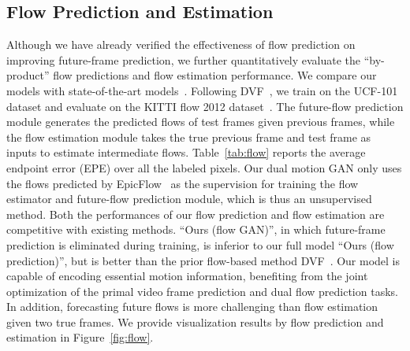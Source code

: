 \documentclass[10pt,twocolumn,letterpaper]{article}
\begin{document}
	\subsection{Flow Prediction and Estimation}
	Although we have already verified the effectiveness of flow prediction on improving future-frame prediction,
	we further quantitatively evaluate the ``by-product'' flow predictions and flow estimation performance. We compare our models with state-of-the-art models~\cite{brox2011large,revaud2015epicflow,fischer2015flownet}. Following DVF~\cite{liu2017video}, we train on the UCF-101 dataset and evaluate on the KITTI flow 2012 dataset~\cite{geiger2013vision}. The future-flow prediction module generates the predicted flows of test frames given previous frames, while the flow estimation module takes the true previous frame and test frame as inputs to estimate intermediate flows. Table~\ref{tab:flow} reports the average endpoint error (EPE) over all the labeled pixels. Our dual motion GAN only uses the flows predicted by EpicFlow~\cite{revaud2015epicflow} as the supervision for training the flow estimator and future-flow prediction module, which is thus an unsupervised method. Both the performances of our flow prediction and flow estimation are competitive with existing methods. ``Ours (flow GAN)'', in which future-frame prediction is eliminated during training, is inferior to our full model ``Ours (flow prediction)'', but is better than the prior flow-based method DVF~\cite{liu2017video}. Our model is capable of encoding essential motion information, benefiting from the joint optimization of the primal video frame prediction and dual flow prediction tasks. In addition, forecasting future flows is more challenging than flow estimation given two true frames. We provide visualization results by flow prediction and estimation in Figure~\ref{fig:flow}.
	
\end{document}

